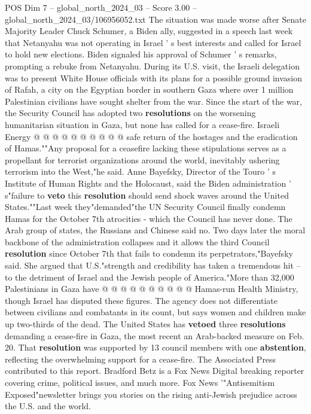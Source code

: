 \begin{textsample}{POS Dim 7 – global\_north\_2024\_03 – Score 3.00 – global\_north\_2024\_03/106956052.txt}
The situation was made worse after Senate Majority Leader Chuck Schumer, a Biden ally, suggested in a speech last week that Netanyahu was not operating in Israel ' s best interests and called for Israel to hold new elections.
Biden signaled his approval of Schumer ' s remarks, prompting a rebuke from Netanyahu.
During its U.S. visit, the Israeli delegation was to present White House officials with its plans for a possible ground invasion of Rafah, a city on the Egyptian border in southern Gaza where over 1 million Palestinian civilians have sought shelter from the war.
Since the start of the war, the Security Council has adopted two \textbf{resolutions} on the worsening humanitarian situation in Gaza, but none has called for a cease-fire.
Israeli Energy @ @ @ @ @ @ @ @ @ @ safe return of the hostages and the eradication of Hamas.""Any proposal for a ceasefire lacking these stipulations serves as a propellant for terrorist organizations around the world, inevitably ushering terrorism into the West,"he said.
Anne Bayefsky, Director of the Touro ' s Institute of Human Rights and the Holocaust, said the Biden administration ' s"failure to \textbf{veto} this \textbf{resolution} should send shock waves around the United States.""Last week they"demanded"the UN Security Council finally condemn Hamas for the October 7th atrocities - which the Council has never done.
The Arab group of states, the Russians and Chinese said no.
Two days later the moral backbone of the administration collapses and it allows the third Council \textbf{resolution} since October 7th that fails to condemn its perpetrators,"Bayefsky said.
She argued that U.S."strength and credibility has taken a tremendous hit -- to the detriment of Israel and the Jewish people of America."More than 32,000 Palestinians in Gaza have @ @ @ @ @ @ @ @ @ @ Hamas-run Health Ministry, though Israel has disputed these figures.
The agency does not differentiate between civilians and combatants in its count, but says women and children make up two-thirds of the dead.
The United States has \textbf{vetoed} three \textbf{resolutions} demanding a cease-fire in Gaza, the most recent an Arab-backed measure on Feb. 20.
That \textbf{resolution} was supported by 13 council members with one \textbf{abstention}, reflecting the overwhelming support for a cease-fire.
The Associated Press contributed to this report.
Bradford Betz is a Fox News Digital breaking reporter covering crime, political issues, and much more.
Fox News '"Antisemitism Exposed"newsletter brings you stories on the rising anti-Jewish prejudice across the U.S. and the world.

\end{textsample}
